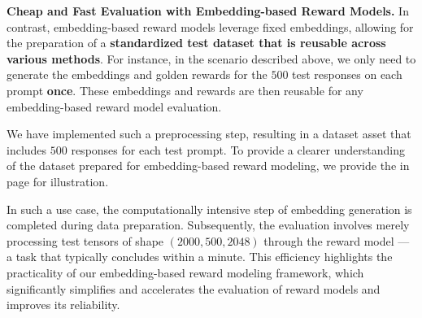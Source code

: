 \textbf{Cheap and Fast Evaluation with Embedding-based Reward Models.}
In contrast, embedding-based reward models leverage fixed embeddings, allowing for the preparation of a \textbf{standardized test dataset that is reusable across various methods}. For instance, in the scenario described above, we only need to generate the embeddings and golden rewards for the $500$ test responses on each prompt \textbf{once}. These embeddings and rewards are then reusable for any embedding-based reward model evaluation.

We have implemented such a preprocessing step, resulting in a dataset asset that includes $500$ responses for each test prompt. To provide a clearer understanding of the dataset prepared for embedding-based reward modeling, we provide the  in page \pageref{algo} for illustration.


In such a use case, the computationally intensive step of embedding generation is completed during data preparation. Subsequently, the evaluation involves merely processing test tensors of shape $(2000, 500, 2048)$ through the reward model --- a task that typically concludes within a minute. This efficiency highlights the practicality of our embedding-based reward modeling framework, which significantly simplifies and accelerates the evaluation of reward models and improves its reliability.




